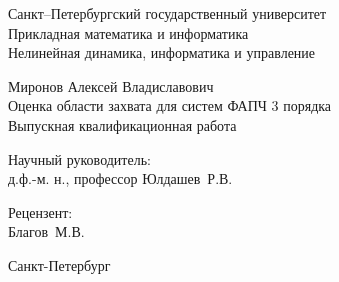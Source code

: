 
\begin{titlepage}
\begin{center}
\normalsize{Санкт--Петербургский государственный университет}\\
\normalsize{Прикладная математика и информатика}\\
\normalsize{Нелинейная динамика, информатика и управление}

\vspace{35mm}

\normalsize{Миронов Алексей Владиславович} \\[8mm]
\large{Оценка области захвата для систем ФАПЧ 3 порядка}\\[3mm]
\small{Выпускная квалификационная работа}

\vspace{50mm}

\begin{flushright}
{Научный руководитель:} \\
д.ф.-м. н., профессор Юлдашев~Р.\:В.
\end{flushright}
\begin{flushright}
{Рецензент:} \\
Благов~М.\:В.
\end{flushright}

\vfill 

{Санкт-Петербург}
\par{\number\year}
\end{center}
\end{titlepage}
\restoregeometry
\thispagestyle{empty}